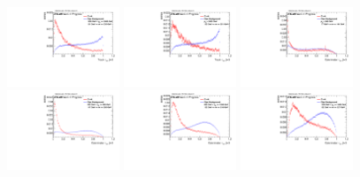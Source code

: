\begin{figure}[H]
\includegraphics[width=0.3\textwidth]{sascha_input/Appendix/Distributions/top/distributions/beta3/h_normal_tj_nSub32_3_bin5.pdf} \hspace{1mm}
\includegraphics[width=0.3\textwidth]{sascha_input/Appendix/Distributions/top/distributions/beta3/h_normal_tj_nSub32_3_bin6.pdf} 
\bigskip
\includegraphics[width=0.3\textwidth]{sascha_input/Appendix/Distributions/top/distributions/beta3/h_recoJet_nSub32_3_bin1.pdf} \hspace{1mm}
\includegraphics[width=0.3\textwidth]{sascha_input/Appendix/Distributions/top/distributions/beta3/h_recoJet_nSub32_3_bin2.pdf} \hspace{1mm}
\includegraphics[width=0.3\textwidth]{sascha_input/Appendix/Distributions/top/distributions/beta3/h_recoJet_nSub32_3_bin3.pdf} 
\bigskip
\includegraphics[width=0.3\textwidth]{sascha_input/Appendix/Distributions/top/distributions/beta3/h_recoJet_nSub32_3_bin4.pdf} \hspace{6mm}

\end{figure}
